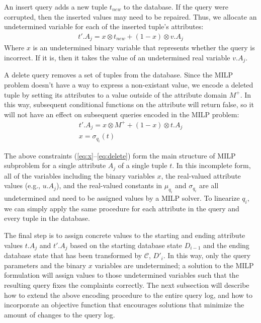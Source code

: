 An insert query adds a new tuple $t_{new}$ to the database.  If the query were 
corrupted, then the inserted values may need to be repaired.  Thus, we allocate
an undetermined variable for each of the inserted tuple's attributes:
{\scriptsize
\begin{eqnarray}
\label{eq:insert}
t'.A_j = x \otimes t_{new} + (1-x) \otimes v.A_j 
\end{eqnarray}
}
\noindent Where $x$ is an undetermined binary variable that represents whether
the query is incorrect.  If it is, then it takes the value of an undetermined real 
variable $v.A_j$.


A delete query removes a set of tuples from the database.  
Since the MILP problem doesn't have a way to express a non-existant value, 
we encode a deleted tuple by setting its attributes to a value
outside of the attribute domain $M^+$.  In this way, subsequent conditional functions
on the attribute will return false, so it will not have an effect on subsequent queries encoded
in the MILP problem:
{\scriptsize
\begin{eqnarray}
\label{eq:delete}
t'.A_j = x \otimes M^+ + (1-x) \otimes t.A_j \nonumber \\
x = \sigma_q_i(t)
\end{eqnarray}
}



The above constraints (\ref{eq:x}--\ref{eq:delete})
form the main structure of MILP subproblem for a single attribute $A_j$ of a single tuple $t$.
In this incomplete form, all of the variables including the binary variables $x$,
the real-valued attribute values (e.g., $u.A_j$),
and the real-valued constants in $\mu_q_i$ and $\sigma_q_i$ are all undetermined
and need to be assigned values by a MILP solver.  
To linearize $q_i$, we can simply apply the same procedure for each attribute in the 
query and every tuple in the database.

The final step is to assign concrete values to the starting and ending attribute values 
$t.A_j$ and $t'.A_j$ based on the starting database state $D_{i-1}$ and the ending database 
state that has been transformed by $\mathcal{C}$, $D'_i$.
In this way, only the query parameters and the binary $x$ variables are undetermined;
a solution to the MILP formulation will assign values to those undetermined variables
such that the resulting query fixes the complaints correctly.
The next subsection will describe how to extend the above encoding procedure to the 
entire query log, and how to incorporate an objective function that encourages solutions
that minimize the amount of changes to the query log.






